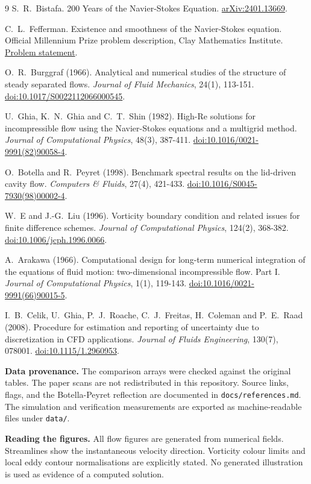 \documentclass[11pt,a4paper]{article}
\newcommand{\code}[1]{\texttt{#1}}
\begin{document}
\clearpage
\begin{thebibliography}{9}
S.~R.~Bistafa. 200 Years of the Navier-Stokes Equation.
\href{https://arxiv.org/abs/2401.13669}{arXiv:2401.13669}.

C.~L.~Fefferman. Existence and smoothness of the Navier-Stokes equation.
Official Millennium Prize problem description, Clay Mathematics Institute.
\href{https://www.claymath.org/wp-content/uploads/2022/06/navierstokes.pdf}{Problem statement}.

O.~R.~Burggraf (1966).
Analytical and numerical studies of the structure of steady separated flows.
\emph{Journal of Fluid Mechanics}, 24(1), 113-151.
\href{https://doi.org/10.1017/S0022112066000545}{doi:10.1017/S0022112066000545}.

U.~Ghia, K.~N.~Ghia and C.~T.~Shin (1982).
High-Re solutions for incompressible flow using the Navier-Stokes equations
and a multigrid method.
\emph{Journal of Computational Physics}, 48(3), 387-411.
\href{https://doi.org/10.1016/0021-9991(82)90058-4}{doi:10.1016/0021-9991(82)90058-4}.

O.~Botella and R.~Peyret (1998).
Benchmark spectral results on the lid-driven cavity flow.
\emph{Computers \& Fluids}, 27(4), 421-433.
\href{https://doi.org/10.1016/S0045-7930(98)00002-4}{doi:10.1016/S0045-7930(98)00002-4}.

W.~E and J.-G.~Liu (1996).
Vorticity boundary condition and related issues for finite difference schemes.
\emph{Journal of Computational Physics}, 124(2), 368-382.
\href{https://doi.org/10.1006/jcph.1996.0066}{doi:10.1006/jcph.1996.0066}.

A.~Arakawa (1966).
Computational design for long-term numerical integration of the equations of
fluid motion: two-dimensional incompressible flow. Part I.
\emph{Journal of Computational Physics}, 1(1), 119-143.
\href{https://doi.org/10.1016/0021-9991(66)90015-5}{doi:10.1016/0021-9991(66)90015-5}.

I.~B.~Celik, U.~Ghia, P.~J.~Roache, C.~J.~Freitas, H.~Coleman and P.~E.~Raad (2008).
Procedure for estimation and reporting of uncertainty due to discretization in CFD applications.
\emph{Journal of Fluids Engineering}, 130(7), 078001.
\href{https://doi.org/10.1115/1.2960953}{doi:10.1115/1.2960953}.
\end{thebibliography}

\vspace{1cm}
\textbf{Data provenance.} The comparison arrays were checked against the
original tables. The paper scans are not redistributed in this repository.
Source links, flags, and the Botella-Peyret reflection are documented in
\code{docs/references.md}. The simulation and verification measurements are
exported as machine-readable files under \code{data/}.

\textbf{Reading the figures.} All flow figures are generated from numerical
fields. Streamlines show the instantaneous velocity direction. Vorticity colour
limits and local eddy contour normalisations are explicitly stated. No generated
illustration is used as evidence of a computed solution.
\end{document}

